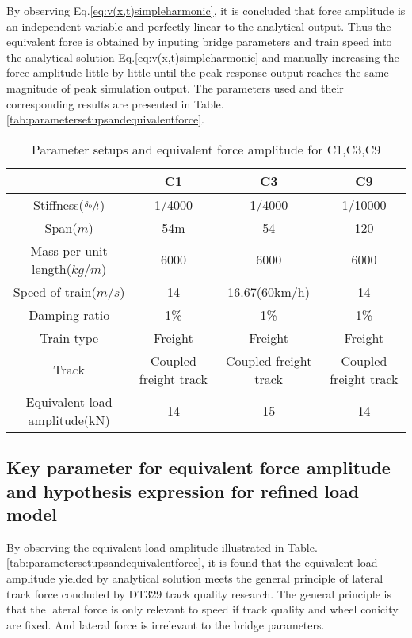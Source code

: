 By observing Eq.\ref{eq:v(x,t)simpleharmonic}, it is concluded that force amplitude is an independent variable and perfectly linear to the analytical output. Thus the equivalent force is obtained by inputing bridge parameters and train speed into the analytical solution Eq.\ref{eq:v(x,t)simpleharmonic} and manually increasing the force amplitude little by little until the peak response output reaches the same magnitude of peak simulation output. The parameters used and their corresponding results are presented in Table.\ref{tab:parametersetupsandequivalentforce}.


\begin{table}[h!]
    \centering
    \caption{Parameter setups and equivalent force amplitude for C1,C3,C9}
    \begin{tabular}{c|ccc}
        \hline
        & C1 & C3 & C9 \\
        \hline
        Stiffness($\sfrac{\delta_0}{l}$) & 1/4000 & 1/4000 & 1/10000 \\
        Span($m$) & 54m & 54 & 120 \\ 
        Mass per unit length($kg/m$) & 6000 & 6000 & 6000\\
        Speed of train($m/s$) & 14 & 16.67(60km/h) & 14\\
        Damping ratio & 1\% & 1\% & 1\%\\
        Train type & Freight & Freight & Freight \\
        Track & Coupled freight track & Coupled freight track & Coupled freight track \\
        \hline
        Equivalent load amplitude(kN) & 14 & 15 & 14 \\
        \hline
    \end{tabular}
\end{table}

\subsection{Key parameter for equivalent force amplitude and hypothesis expression for refined load model}\label{sec:keyparameterforequivalentamplitudeandhypothesis}

By observing the equivalent load amplitude illustrated in Table.\ref{tab:parametersetupsandequivalentforce}, it is found that the equivalent load amplitude yielded by analytical solution meets the general principle of lateral track force concluded by DT329 track quality research. The general principle is that the lateral force is only relevant to speed if track quality and wheel conicity are fixed. And lateral force is irrelevant to the bridge parameters.
 

